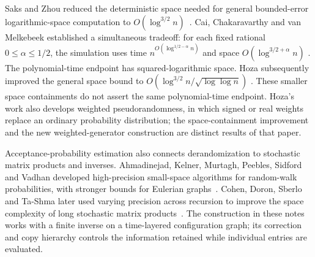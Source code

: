 Saks and Zhou reduced the deterministic space needed for general
bounded-error logarithmic-space computation to
$O(\log^{3/2}n)$~\cite{SaksZhou1999}.
Cai, Chakaravarthy and van Melkebeek established a simultaneous
tradeoff: for each fixed rational $0\le\alpha\le1/2$, the simulation
uses time $n^{O(\log^{1/2-\alpha}n)}$ and space
$O(\log^{3/2+\alpha}n)$
\cite{CaiChakaravarthyVanMelkebeek2006}.
The polynomial-time endpoint has squared-logarithmic space.
Hoza subsequently improved the general space bound to
$O(\log^{3/2}n/\sqrt{\log\log n})$
\cite[Theorem~1.6 and Corollary~A.5]{Hoza2021}.
These smaller space containments do not assert the same polynomial-time
endpoint. Hoza's work also develops weighted pseudorandomness, in which
signed or real weights replace an ordinary probability distribution;
the space-containment improvement and the new weighted-generator
construction are distinct results of that paper.

Acceptance-probability estimation also connects derandomization to
stochastic matrix products and inverses. Ahmadinejad, Kelner, Murtagh,
Peebles, Sidford and Vadhan developed high-precision small-space
algorithms for random-walk probabilities, with stronger bounds for
Eulerian graphs~\cite{AhmadinejadKelnerMurtaghPeeblesSidfordVadhan2020}.
Cohen, Doron, Sberlo and Ta-Shma later used varying precision across
recursion to improve the space complexity of long stochastic matrix
products~\cite{CohenDoronSberloTaShma2023}. The construction in these notes works with a finite inverse on a time-layered configuration graph;
its correction and copy hierarchy controls the information retained
while individual entries are evaluated.

